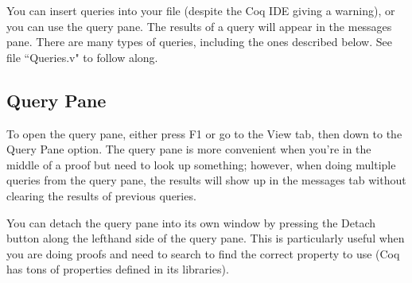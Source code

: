 
You can insert queries into your file (despite the Coq IDE giving a warning), or you can use the query pane. 
The results of a query will appear in the messages pane.
There are many types of queries, including the ones described below. 
See file ``Queries.v" to follow along.

\subsection{Query Pane} \label{query_pane}
To open the query pane, either press F1 or go to the View tab, then down to the Query Pane option. 
The query pane is more convenient when you're in the middle of a proof but need to look up something; 
however, when doing multiple queries from the query pane, the results will show up in the messages tab without clearing the results of previous queries.

\begin{figure}[!h]
\end{figure}

\noindent
You can detach the query pane into its own window by pressing the Detach button along the lefthand side of the query pane.
This is particularly useful when you are doing proofs and need to search to find the correct property to use 
(Coq has tons of properties defined in its libraries).




